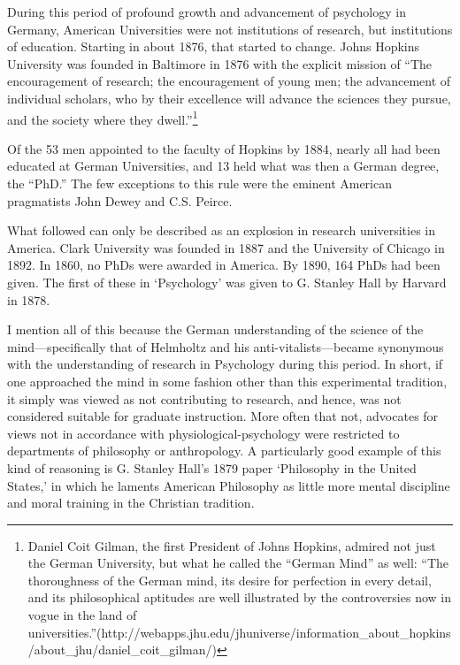 \begin{refsection}
During this period of profound growth and advancement of psychology in Germany, American Universities were not institutions of research, but institutions of education. Starting in about 1876, that started to change. Johns Hopkins University was founded in Baltimore in 1876 with the explicit mission of ``The encouragement of research; the encouragement of young men; the advancement of individual scholars, who by their excellence will advance the sciences they pursue, and the society where they dwell.''\footnote{Daniel Coit Gilman, the first President of Johns Hopkins, admired not just the German University, but what he called the ``German Mind'' as well: “The thoroughness of the German mind, its desire for perfection in every detail, and its philosophical aptitudes are well illustrated by the controversies now in vogue in the land of universities.”(http:\slash \slash webapps.jhu.edu\slash jhuniverse\slash information\_about\_hopkins\slash about\_jhu\slash daniel\_coit\_gilman\slash )} 

Of the 53 men appointed to the faculty of Hopkins by 1884, nearly all had been educated at German Universities, and 13 held what was then a German degree, the “PhD.” The few exceptions to this rule were the eminent American pragmatists John Dewey and C.S. Peirce. 

What followed can only be described as an explosion in research universities in America. Clark University was founded in 1887 and the University of Chicago in 1892. In 1860, no PhDs were awarded in America. By 1890, 164 PhDs had been given. The first of these in ‘Psychology’ was given to G. Stanley Hall by Harvard in 1878.

I mention all of this because the German understanding of the science of the mind---specifically that of Helmholtz and his anti-vitalists---became synonymous with the understanding of research in Psychology during this period. In short, if one approached the mind in some fashion other than this experimental tradition, it simply was viewed as not contributing to research, and hence, was not considered suitable for graduate instruction. More often that not, advocates for views not in accordance with physiological-psychology were restricted to departments of philosophy or anthropology. A particularly good example of this kind of reasoning is G. Stanley Hall’s 1879 paper ‘Philosophy in the United States,’ in which he laments American Philosophy as little more mental discipline and moral training in the Christian tradition.


\end{refsection}
